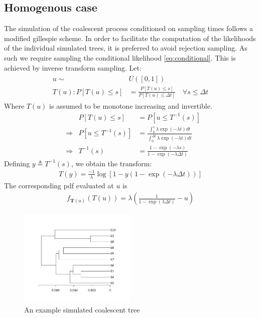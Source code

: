 \documentclass{report}
\theoremstyle{definition}
\begin{document}
\subsection{Homogenous case}
The simulation of the coalescent process conditioned on sampling times follows a modified gillespie scheme. In order to facilitate the computation of the likelihoods of the individual simulated trees, it is preferred to avoid rejection sampling. As such we require sampling the conditional likelihood \ref{eq:conditional}. This is achieved by inverse transform sampling.
Let:
\begin{gather}\label{eq:cond_timedep}
\begin{aligned}
  u\sim& U([0,1])\\
  T(u) : P[T(u)\leq s] &= \frac{P[T(u) \leq s]}{P[T(u) \leq \Delta t]} \quad\forall s \leq \Delta t
\end{aligned}
\end{gather}
Where $T(u)$ is assumed to be monotone increasing and invertible.
\begin{align*}
  &&P[T(u)\leq s] &= P[u\leq T^{-1}(s)]\\
  &\Rightarrow& P[u\leq T^{-1}(s)] &= \frac{\int_0^s\lambda\exp(-\lambda t)dt}{\int_0^{\Delta t}\lambda\exp(-\lambda t)dt}\\
  &\Rightarrow& T^{-1}(s) &= \frac{1-\exp(-\lambda s)}{1-\exp(-\lambda \Delta t)}
\end{align*}
Defining $y\triangleq T^{-1}(s)$, we obtain the transform:
\begin{gather}
T(y) = \frac{-1}{\lambda}\log[1-y(1-\exp(-\lambda\Delta t))]
\end{gather}
The corresponding pdf evaluated at $u$ is
\begin{gather}
f_{\mathbf{T}(u)}(T(u)) = \lambda \left(\frac{1}{1-\exp(\lambda\Delta t)}-u\right)
\end{gather}
\newpage
\begin{figure}[h]
  \centering
    \includegraphics[width=0.5\textwidth]{plots/Coalescent_Example.png}
    \caption{An example simulated coalescent tree}
\end{figure}
\end{document}
